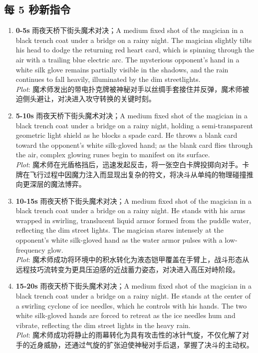 \documentclass[11pt,a4paper]{article}
\begin{document}
\subsection*{每 5 秒新指令}
\begin{enumerate}
\item \textbf{0-5s} 雨夜天桥下街头魔术对决；A medium fixed shot of the magician in a black trench coat under a bridge on a rainy night. The magician slightly tilts his head to dodge the returning red heart card, which is spinning through the air with a trailing blue electric arc. The mysterious opponent's hand in a white silk glove remains partially visible in the shadows, and the rain continues to fall heavily, illuminated by the dim streetlights.\\\newline \textit{Plot}: 魔术师发出的带电扑克牌被神秘对手以丝绸手套接住并反弹，魔术师被迫侧头避让，对决进入攻守转换的关键时刻。
\item \textbf{5-10s} 雨夜天桥下街头魔术对决；A medium fixed shot of the magician in a black trench coat under a bridge on a rainy night, holding a semi-transparent geometric light shield as he blocks a spade card. He throws a blank card toward the opponent's white silk-gloved hand; as the blank card flies through the air, complex glowing runes begin to manifest on its surface.\\\newline \textit{Plot}: 魔术师在光盾格挡后，迅速发起反击，将一张空白卡牌投掷向对手。卡牌在飞行过程中因魔力注入而显现出复杂的符文，将决斗从单纯的物理碰撞推向更深层的魔法博弈。
\item \textbf{10-15s} 雨夜天桥下街头魔术对决；A medium fixed shot of the magician in a black trench coat under a bridge on a rainy night. He stands with his arms wrapped in swirling, translucent liquid armor formed from the puddle water, reflecting the dim street lights. The magician stares intensely at the opponent's white silk-gloved hand as the water armor pulses with a low-frequency glow.\\\newline \textit{Plot}: 魔术师成功将环境中的积水转化为液态铠甲覆盖在手臂上，战斗形态从远程技巧流转变为更具压迫感的近战蓄力姿态，对决进入高压对峙阶段。
\item \textbf{15-20s} 雨夜天桥下街头魔术对决；A medium fixed shot of the magician in a black trench coat under a bridge on a rainy night. He stands at the center of a swirling cyclone of ice needles, which he controls with his hands. The two white silk-gloved hands are forced to retreat as the ice needles hum and vibrate, reflecting the dim street lights in the heavy rain.\\\newline \textit{Plot}: 魔术师成功将静止的雨幕转化为具有攻击性的冰针气旋，不仅化解了对手的近身威胁，还通过气旋的扩张迫使神秘对手后退，掌握了决斗的主动权。

\end{enumerate}
\end{document}
